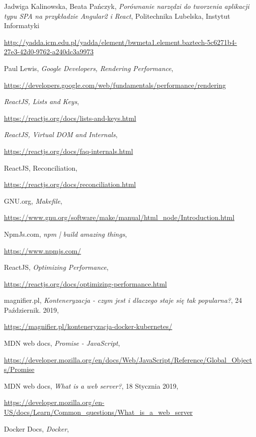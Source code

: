 \begin{thebibliography}{99}
Jadwiga Kalinowska, Beata Pańczyk,
\emph{Porównanie narzędzi do tworzenia aplikacji typu SPA na przykładzie Angular2 i React},
Politechnika Lubelska, Instytut Informatyki

\url{http://yadda.icm.edu.pl/yadda/element/bwmeta1.element.baztech-5c6271b4-27e3-42d0-9762-a240dc3a9973}

Paul Lewis,
\emph{Google Developers, Rendering Performance},

\url{https://developers.google.com/web/fundamentals/performance/rendering}

 \emph{ReactJS,  Lists and Keys},

\url{https://reactjs.org/docs/lists-and-keys.html}

\emph{ReactJS, Virtual DOM and Internals}, 

\url{https://reactjs.org/docs/faq-internals.html}

ReactJS, Reconciliation,

\url{https://reactjs.org/docs/reconciliation.html}

GNU.org, 
\emph{Makefile},

\url{https://www.gnu.org/software/make/manual/html_node/Introduction.html}

 NpmJs.com,
\emph{npm | build amazing things},

\url{https://www.npmjs.com/}

 ReactJS,
\emph{Optimizing Performance},

\url{https://reactjs.org/docs/optimizing-performance.html}

magnifier.pl,
\emph{Konteneryzacja - czym jest i dlaczego staje się tak popularna?},
24 Październik. 2019,

\url{https://magnifier.pl/konteneryzacja-docker-kubernetes/}

MDN web docs,
\emph{Promise - JavaScript},

\url{https://developer.mozilla.org/en/docs/Web/JavaScript/Reference/Global_Objects/Promise}

MDN web docs,
\emph{What is a web server?},
18 Stycznia 2019,

\url{https://developer.mozilla.org/en-US/docs/Learn/Common_questions/What_is_a_web_server}

Docker Docs,
\emph{Docker},


\end{thebibliography}
